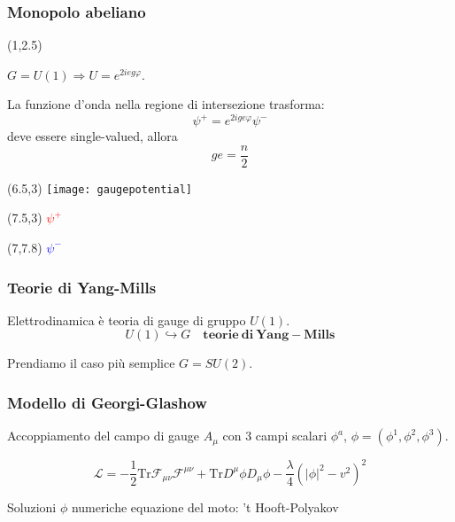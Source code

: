 \begin{frame}\frametitle{Monopolo abeliano}
\begin{textblock}{5.5}(1,2.5){
   $G = U(1) \Rightarrow
   U = e^{2ieg\varphi}$. \\ \bigskip

   La funzione d'onda nella regione di intersezione trasforma:
   $$\psi^+ = e^{2ige\varphi} \psi^-$$
   deve essere single-valued, allora
   $$ \boxed{ge = \frac{n}{2}} $$
}
\end{textblock}

\begin{textblock}{15}(6.5,3)
    \texttt{[image: gaugepotential]}
\end{textblock}
\Huge
\begin{textblock}{1}(7.5,3)
    {\textcolor{red}{$\psi^+$}}
\end{textblock}

\begin{textblock}{1}(7,7.8)
    {\textcolor{blue}{$\psi^-$}}
\end{textblock}

\end{frame}
\begin{frame}
\frametitle{Teorie di Yang-Mills}
Elettrodinamica è teoria di gauge di gruppo $U(1)$.
$$ U(1) \hookrightarrow G \quad \mathbf{teorie \: di \: Yang-Mills}$$

Prendiamo il caso più semplice $G=SU(2)$.\\

\end{frame}

\begin{frame}
\frametitle{Modello di Georgi-Glashow}
Accoppiamento del campo di gauge $A _\mu$ con 3 campi scalari $\phi^a$,
$\phi = (\phi^1,\phi^2,\phi^3)$.\\ \bigskip

\begin{equation*}
   \mathcal{L} = - \frac{1}{2} \mathrm{Tr}\mathcal{F}_{\mu\nu}\mathcal{F}^{\mu\nu}
                 + \mathrm{Tr} D^\mu\phi D_\mu \phi
                 - \frac{\lambda}{4}( |\phi|^2 - v^2 )^2
\end{equation*}

\bigskip\bigskip
Soluzioni $\phi$ numeriche equazione del moto: 't Hooft-Polyakov

\end{frame}

